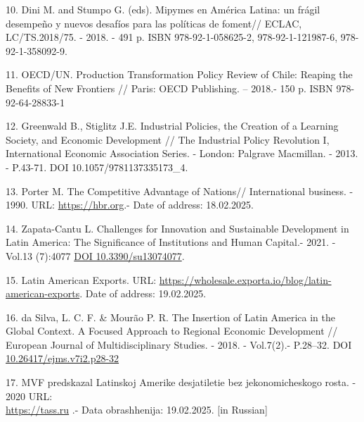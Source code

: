 \begin{references}
10. Dini M. and Stumpo G. (eds). Mipymes en América Latina: un frágil
desempeño y nuevos desafíos para las políticas de foment// ECLAC,
LC/TS.2018/75. - 2018. - 491 p. ISBN 978-92-1-058625-2,
978-92-1-121987-6, 978-92-1-358092-9.

11. OECD/UN. Production Transformation Policy Review of Chile: Reaping
the Benefits of New Frontiers // Paris: OECD Publishing. -- 2018.- 150
p. ISBN 978-92-64-28833-1

12. Greenwald B., Stiglitz J.E. Industrial Policies, the Creation of a
Learning Society, and Economic Development // The Industrial Policy
Revolution I, International Economic Association Series. - London:
Palgrave Macmillan. - 2013. - P.43-71. DOI 10.1057/9781137335173\_4.

13. Porter M. The Competitive Advantage of Nations// International
business. - 1990. URL:
\href{https://hbr.org/1990/03/the-competitive-advantage-of-nations}{https://hbr.org}.-
Date of address: 18.02.2025.

14. Zapata-Cantu L. Challenges for Innovation and Sustainable Development
in Latin America: The Signif\-icance of Institutions and Human Capital.-
2021. -Vol.13 (7):4077
\href{https://doi.org/10.3390/su13074077}{DOI 10.3390/su13074077}.

15. Latin American Exports. URL:
\url{https://wholesale.exporta.io/blog/latin-american-exports}. Date of
add\-ress: 19.02.2025.

16. da Silva, L. C. F. \& Mourão P. R. The Insertion of Latin America in
the Global Context. A Focused Approach to Regional Economic Development
// European Journal of Multidisciplinary Studies. - 2018. - Vol.7(2).-
P.28--32. DOI
\href{http://dx.doi.org/10.26417/ejms.v7i2.p28-32}{10.26417/ejms.v7i2.p28-32}

17. MVF predskazal Latinskoj Amerike desjatiletie bez jekonomicheskogo
rosta. - 2020 URL: \\\href{https://tass.ru/ekonomika/8266077}{https://tass.ru} .- Data
obrashhenija: 19.02.2025. {[}in Russian{]}
\end{references}

